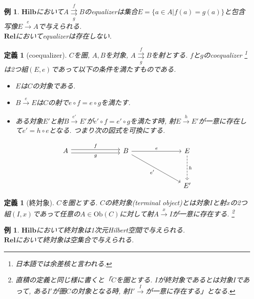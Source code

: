 \documentclass[a4paper,12pt]{ltjsarticle}
\theoremstyle{break}
\newtheorem{defn}[thm]{定義}
\newtheorem{eg}[thm]{例}
\newcommand{\rel}{\mathbf{Rel}}
\newcommand{\hilb}{\mathbf{Hilb}}
\newcommand{\Ob}{\mathrm{Ob}}
\newcommand{\xr}[1]{\xrightarrow{#1}}
\newcommand{\ci}{\circ}
\numberwithin{equation}{section}
\begin{document}
\begin{eg}
  $\hilb$において$A \overset{f}{\underset{g}{\rightrightarrows}} B$のequalizerは集合$E=\{ a \in A | f(a)=g(a) \}$と包含写像$E \xr{e} A$で与えられる. \\
  $\rel$においてequalizerは存在しない. 
\end{eg}  

\begin{defn}[coequalizer]
  $C$を圏, $A, B$を対象, $A \overset{f}{\underset{g}{\rightrightarrows}} B$を射とする. 
  $f$と$g$のcoequalizer
  \footnote{
    日本語では余差核と言われる.
    }
  は2つ組$(E, e)$であって以下の条件を満たすものである. 
  \begin{itemize}
    \item $E$は$C$の対象である. 
    \item $B \xr{e} E$は$C$の射で$e \ci f = e \ci g$を満たす. 
    \item ある対象$E'$と射$B \xr{e'} E'$が$e' \ci f = e' \ci g$を満たす時, 射$E \xr{h} E'$が一意に存在して$e' = h \ci e$となる. 
    つまり次の図式を可換にする. 
  \end{itemize}
  \[\begin{tikzcd}
    A &&& B &&& E \\
    \\
    &&&&&& {E'}
    \arrow["g"', shift right=1, from=1-1, to=1-4]
    \arrow["e", from=1-4, to=1-7]
    \arrow["h", dashed, from=1-7, to=3-7]
    \arrow["{e'}"', from=1-4, to=3-7]
    \arrow["f", shift left=1, from=1-1, to=1-4]
  \end{tikzcd}\]  
\end{defn}

\begin{defn}[終対象]
  $C$を圏とする. 
  $C$の終対象(terminal object)とは対象$I$と射$x$の2つ組$(I,x)$であって任意の$A \in \Ob(C)$に対して射$A \xr{x} I$が一意に存在する.
  \footnote{
  直積の定義と同じ様に書くと「$C$を圏とする. 
  $I$が終対象であるとは対象$I$であって, ある$I'$が圏$C$の対象となる時, 射$I' \xr I$が一意に存在する」となる. 
  } 
\end{defn}

\begin{eg}
  $\hilb$において終対象は1次元Hilbert空間で与えられる. \\
  $\rel$において終対象は空集合で与えられる. 
\end{eg}
\end{document}
